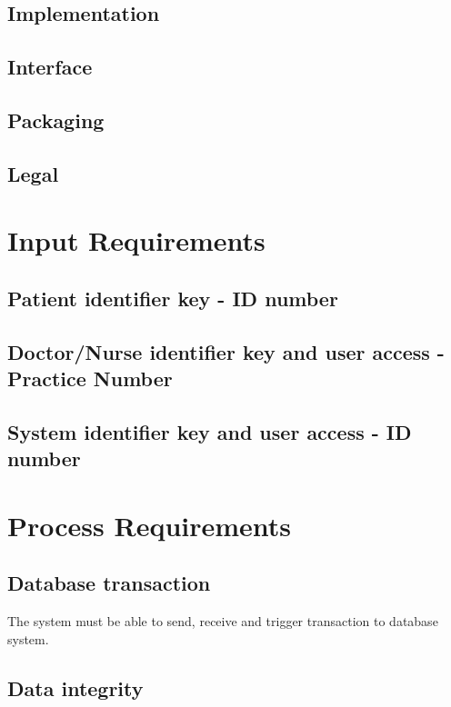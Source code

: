 \documentclass[a4paper]{article}
\begin{document}
\subsection{Implementation}

\subsection{Interface}

\subsection{Packaging}

\subsection{Legal}

\section{Input Requirements}

\subsection{Patient identifier key - ID number}

\subsection{Doctor/Nurse identifier key and user access - Practice Number}

\subsection{System identifier key and user access - ID number}

\section{Process Requirements}

\subsection{Database transaction}

The system must be able to send, receive and trigger transaction to database system.

\subsection{Data integrity}
\end{document}
